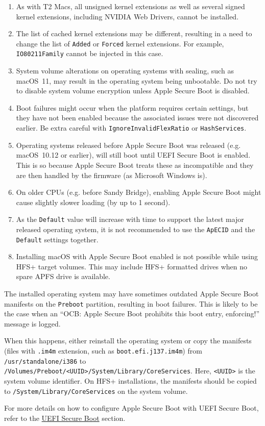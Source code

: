 \documentclass[]{article}
\providecommand{\tightlist}{%
  \setlength{\itemsep}{0pt}\setlength{\parskip}{0pt}}
\begin{document}
\begin{enumerate}
  \begin{enumerate}
    \tightlist
    \item As with T2 Macs, all unsigned kernel extensions as well as several
      signed kernel extensions, including NVIDIA Web Drivers, cannot be installed.
    \item The list of cached kernel extensions may be different, resulting in a need
      to change the list of \texttt{Added} or \texttt{Forced} kernel extensions.
      For example, \texttt{IO80211Family} cannot be injected in this case.
    \item System volume alterations on operating systems with sealing, such as
      macOS~11, may result in the operating system being unbootable. Do not
      try to disable system volume encryption unless Apple Secure Boot is disabled.
    \item Boot failures might occur when the platform requires certain settings,
      but they have not been enabled because the associated issues were not discovered earlier.
      Be extra careful with \texttt{IgnoreInvalidFlexRatio} or \texttt{HashServices}.
    \item Operating systems released before Apple Secure Boot was released (e.g.
      macOS~10.12 or earlier), will still boot until UEFI Secure Boot is enabled.
      This is so because Apple Secure Boot treats these as incompatible
      and they are then handled by the firmware (as Microsoft Windows is).
    \item On older CPUs (e.g. before Sandy Bridge), enabling Apple Secure Boot
      might cause slightly slower loading (by up to 1 second).
    \item As the \texttt{Default} value will increase with time to support the latest
      major released operating system, it is not recommended to use the \texttt{ApECID}
      and the \texttt{Default} settings together.
    \item Installing macOS with Apple Secure Boot enabled is not possible while using HFS+
      target volumes. This may include HFS+ formatted drives when no spare APFS drive is available.
  \end{enumerate}

  The installed operating system may have sometimes outdated Apple Secure Boot manifests
  on the \texttt{Preboot} partition, resulting in boot failures. This is likely to be the
  case when an ``OCB: Apple Secure Boot prohibits this boot entry, enforcing!'' message
  is logged.

  When this happens, either reinstall the operating
  system or copy the manifests (files with \texttt{.im4m} extension, such as
  \texttt{boot.efi.j137.im4m}) from \texttt{/usr/standalone/i386} to
  \texttt{/Volumes/Preboot/<UUID>/System/Library/CoreServices}. Here, \texttt{<UUID>}
  is the system volume identifier. On HFS+ installations, the manifests should be
  copied to \texttt{/System/Library/CoreServices} on the system volume.

  For more details on how to configure Apple Secure Boot with UEFI Secure Boot,
  refer to the \hyperref[uefisecureboot]{UEFI Secure Boot} section.

\end{enumerate}
\end{document}
